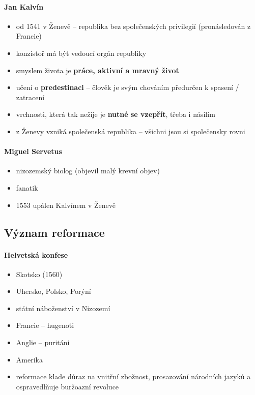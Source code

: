 \paragraph{Jan Kalvín}
\begin{itemize}
\item od 1541 v Ženevě -- republika bez společenských privilegií (pronásledován z Francie)
\item konzistoř má být vedoucí orgán republiky
\item smyslem života je \textbf{práce, aktivní a mravný život}
\item učení o \textbf{predestinaci} -- člověk je svým chováním předurčen k spasení / zatracení
\item vrchnosti, která tak nežije je \textbf{nutné se vzepřít}, třeba i násilím
\item z Ženevy vzniká společenská republika -- všichni jsou si společensky rovni
\end{itemize}

\paragraph{Miguel Servetus}
\begin{itemize}
\item nizozemský biolog (objevil malý krevní objev)
\item fanatik
\item 1553 upálen Kalvínem v Ženevě
\end{itemize}

\subsection{Význam reformace}
\paragraph{Helvetská konfese}
\begin{itemize}
\item Skotsko (1560)
\item Uhersko, Polsko, Porýní
\item státní náboženství v Nizozemí
\item Francie -- hugenoti
\item Anglie -- puritáni
\item Amerika
\item reformace klade důraz na vnitřní zbožnost, prosazování národních jazyků a ospravedlňuje buržoazní revoluce
\end{itemize}

